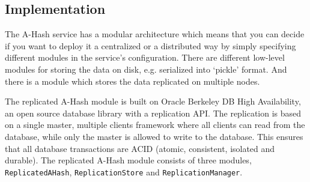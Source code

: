 \documentclass{book}
\begin{document}

\subsection{Implementation} %

The A-Hash service has a modular architecture which means that you can decide if you want to deploy it a centralized or a distributed way by simply specifying different modules in the service's configuration. There are different low-level modules for storing the data on disk, e.g. serialized into `pickle' format. And there is a module which stores the data replicated on multiple nodes.

The replicated A-Hash module is built on Oracle Berkeley DB High Availability, an open source database library with a replication API. The replication is based on a single master, multiple clients framework where all clients can read from the database, while only the master is allowed to write to the database. This ensures that all database transactions are ACID (atomic, consistent, isolated and durable). The replicated A-Hash module consists of three modules, \verb!ReplicatedAHash!, \verb!ReplicationStore! and \verb!ReplicationManager!.
\end{document}
